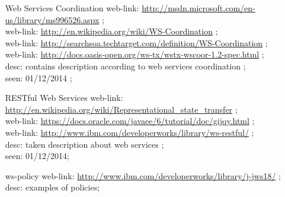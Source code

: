 \begin{enumerate}
\item [Web Services Coordination] web-link: \url{http://msdn.microsoft.com/en-us/library/ms996526.aspx} ; \\
web-link: \url{http://en.wikipedia.org/wiki/WS-Coordination} ; \\
web-link: \url{http://searchsoa.techtarget.com/definition/WS-Coordination} ; \\ 
web-link: \url{http://docs.oasis-open.org/ws-tx/wstx-wscoor-1.2-spec.html} ; \\ desc: contains description according to web services coordination ; \\ seen: 01/12/2014 ; \\
\item [RESTful Web Services] web-link: \url{http://en.wikipedia.org/wiki/Representational_state_transfer} ; \\
web-link: \url{https://docs.oracle.com/javaee/6/tutorial/doc/gijqy.html} ; \\ 
web-link: \url{http://www.ibm.com/developerworks/library/ws-restful/} ; \\ desc: taken description about web services ; \\ seen: 01/12/2014; \\
\item [ws-policy] web-link: 
\url{http://www.ibm.com/developerworks/library/j-jws18/} ; \\ desc: examples of policies; \
\end{enumerate}


